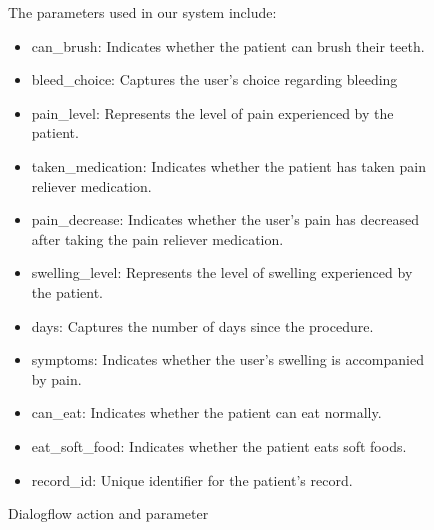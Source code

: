 \documentclass[12pt,oneside,openright,a4paper]{cpe-english-project}
\begin{document}
          \begin{figure}[H]
            \centering
            \caption{Dialogflow action and parameter}\label{fig:dialogflow-actionandparameter}
            \begin{justify}
              \qquad The parameters used in our system include:\par
              \begin{itemize}
                \item can\_brush: Indicates whether the patient can brush their teeth.
                \item bleed\_choice: Captures the user's choice regarding bleeding
                \item pain\_level: Represents the level of pain experienced by the patient.
                \item taken\_medication: Indicates whether the patient has taken pain reliever medication.
                \item pain\_decrease: Indicates whether the user’s pain has decreased after taking the pain reliever medication.
                \item swelling\_level: Represents the level of swelling experienced by the patient.
                \item days: Captures the number of days since the procedure.
                \item symptoms: Indicates whether the user's swelling is accompanied by pain.
                \item can\_eat: Indicates whether the patient can eat normally.
                \item eat\_soft\_food: Indicates whether the patient eats soft foods.
                \item record\_id: Unique identifier for the patient's record.
              \end{itemize}

\end{justify}
\end{figure}
\end{document}
